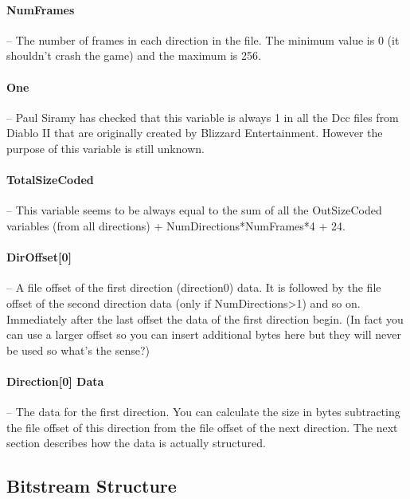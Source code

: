 \paragraph{NumFrames} -- The number of frames in each direction in the file. The 
minimum value is 0 (it shouldn't crash the game) and the maximum is 256.	

\paragraph{One} -- Paul Siramy has checked that this variable is always 1 in 
all the Dcc files from Diablo II that are originally created by Blizzard 
Entertainment. However the purpose of this variable is still unknown.	

\paragraph{TotalSizeCoded} -- This variable seems to be always equal to the sum 
of all the OutSizeCoded variables (from all directions) + NumDirections*NumFrames*4 
+ 24.	

\paragraph{DirOffset[0]} -- A file offset of the first direction (direction0) 
data. It is followed by the file offset of the second direction data (only if 
NumDirections>1) and so on. Immediately after the last offset the data of the 
first direction begin. (In fact you can use a larger offset so you can insert 
additional bytes here but they will never be used so what's the sense?)	

\paragraph{Direction[0] Data} -- The data for the first direction. You can 
calculate the size in bytes subtracting the file offset of this direction from 
the file offset of the next direction. The next section describes how the data 
is actually structured.

\subsection{Bitstream Structure}


